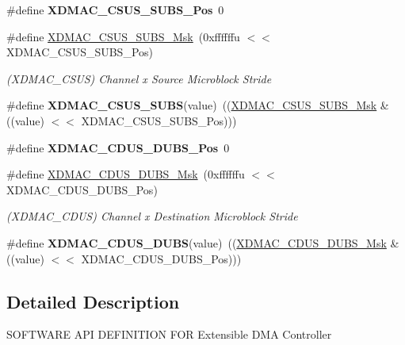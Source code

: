\begin{DoxyCompactItemize}
\item 
\mbox{\label{group__SAMS70__XDMAC_gabe71a37896283684f0eb00b83369ff5c}} 
\#define {\bfseries X\+D\+M\+A\+C\+\_\+\+C\+S\+U\+S\+\_\+\+S\+U\+B\+S\+\_\+\+Pos}~0
\item 
\mbox{\label{group__SAMS70__XDMAC_gad45ae394b8779c0dadfc72dc107bdf43}} 
\#define \mbox{\hyperlink{group__SAMS70__XDMAC_gad45ae394b8779c0dadfc72dc107bdf43}{X\+D\+M\+A\+C\+\_\+\+C\+S\+U\+S\+\_\+\+S\+U\+B\+S\+\_\+\+Msk}}~(0xffffffu $<$$<$ X\+D\+M\+A\+C\+\_\+\+C\+S\+U\+S\+\_\+\+S\+U\+B\+S\+\_\+\+Pos)
\begin{DoxyCompactList}\small\item\em (X\+D\+M\+A\+C\+\_\+\+C\+S\+US) Channel x Source Microblock Stride \end{DoxyCompactList}\item 
\mbox{\label{group__SAMS70__XDMAC_ga49299293673411271ca686591bd59e14}} 
\#define {\bfseries X\+D\+M\+A\+C\+\_\+\+C\+S\+U\+S\+\_\+\+S\+U\+BS}(value)~((\mbox{\hyperlink{group__SAMV71__XDMAC_gad45ae394b8779c0dadfc72dc107bdf43}{X\+D\+M\+A\+C\+\_\+\+C\+S\+U\+S\+\_\+\+S\+U\+B\+S\+\_\+\+Msk}} \& ((value) $<$$<$ X\+D\+M\+A\+C\+\_\+\+C\+S\+U\+S\+\_\+\+S\+U\+B\+S\+\_\+\+Pos)))
\item 
\mbox{\label{group__SAMS70__XDMAC_ga6273e9fa1812798d1fb408bc771f132e}} 
\#define {\bfseries X\+D\+M\+A\+C\+\_\+\+C\+D\+U\+S\+\_\+\+D\+U\+B\+S\+\_\+\+Pos}~0
\item 
\mbox{\label{group__SAMS70__XDMAC_gaca37f4c47181b3ab679d04c10bf1acb4}} 
\#define \mbox{\hyperlink{group__SAMS70__XDMAC_gaca37f4c47181b3ab679d04c10bf1acb4}{X\+D\+M\+A\+C\+\_\+\+C\+D\+U\+S\+\_\+\+D\+U\+B\+S\+\_\+\+Msk}}~(0xffffffu $<$$<$ X\+D\+M\+A\+C\+\_\+\+C\+D\+U\+S\+\_\+\+D\+U\+B\+S\+\_\+\+Pos)
\begin{DoxyCompactList}\small\item\em (X\+D\+M\+A\+C\+\_\+\+C\+D\+US) Channel x Destination Microblock Stride \end{DoxyCompactList}\item 
\mbox{\label{group__SAMS70__XDMAC_ga7645600da33407dcf7645fefa9959938}} 
\#define {\bfseries X\+D\+M\+A\+C\+\_\+\+C\+D\+U\+S\+\_\+\+D\+U\+BS}(value)~((\mbox{\hyperlink{group__SAMV71__XDMAC_gaca37f4c47181b3ab679d04c10bf1acb4}{X\+D\+M\+A\+C\+\_\+\+C\+D\+U\+S\+\_\+\+D\+U\+B\+S\+\_\+\+Msk}} \& ((value) $<$$<$ X\+D\+M\+A\+C\+\_\+\+C\+D\+U\+S\+\_\+\+D\+U\+B\+S\+\_\+\+Pos)))
\end{DoxyCompactItemize}


\subsection{Detailed Description}
S\+O\+F\+T\+W\+A\+RE A\+PI D\+E\+F\+I\+N\+I\+T\+I\+ON F\+OR Extensible D\+MA Controller 